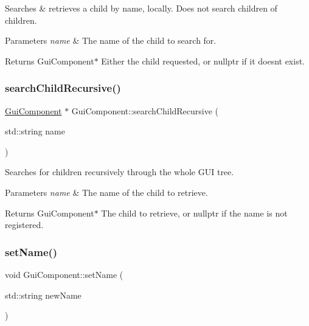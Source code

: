 Searches \& retrieves a child by name, locally. Does not search children of children. 


\begin{DoxyParams}{Parameters}
{\em name} & The name of the child to search for. \\
\hline
\end{DoxyParams}
\begin{DoxyReturn}{Returns}
Gui\+Component$\ast$ Either the child requested, or nullptr if it doesn\textquotesingle{}t exist. 
\end{DoxyReturn}
\mbox{\label{class_gui_component_a7f1e0e731d458135182850a53de06f95}} 
\subsubsection{\texorpdfstring{search\+Child\+Recursive()}{searchChildRecursive()}}
{\footnotesize\ttfamily \mbox{\hyperlink{class_gui_component}{Gui\+Component}} $\ast$ Gui\+Component\+::search\+Child\+Recursive (\begin{DoxyParamCaption}\item[{std\+::string}]{name }\end{DoxyParamCaption})\hspace{0.3cm}{\ttfamily [virtual]}}



Searches for children recursively through the whole G\+UI tree. 


\begin{DoxyParams}{Parameters}
{\em name} & The name of the child to retrieve. \\
\hline
\end{DoxyParams}
\begin{DoxyReturn}{Returns}
Gui\+Component$\ast$ The child to retrieve, or nullptr if the name is not registered. 
\end{DoxyReturn}
\mbox{\label{class_gui_component_ae673013e55aa98c6ee267fad3e282766}} 
\subsubsection{\texorpdfstring{set\+Name()}{setName()}}
{\footnotesize\ttfamily void Gui\+Component\+::set\+Name (\begin{DoxyParamCaption}\item[{std\+::string}]{new\+Name }\end{DoxyParamCaption})}



